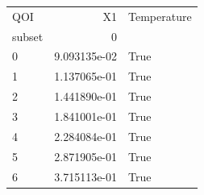 \begin{tabular}{lrl}
\toprule
QOI &           X1 & Temperature \\
subset &           0 \\
\midrule
0 & 9.093135e-02 &        True \\
1 & 1.137065e-01 &        True \\
2 & 1.441890e-01 &        True \\
3 & 1.841001e-01 &        True \\
4 & 2.284084e-01 &        True \\
5 & 2.871905e-01 &        True \\
6 & 3.715113e-01 &        True \\
\bottomrule
\end{tabular}
